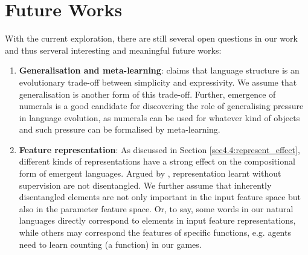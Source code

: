 \section{Future Works}
\label{sec5.2:future_work}

With the current exploration, there are still several open questions in our work and thus serveral interesting and meaningful future works:

\begin{enumerate}
    \item \textbf{Generalisation and meta-learning}: \cite{smith2013linguistic} claims that language structure is an evolutionary trade-off between simplicity and expressivity. We assume that generalisation is another form of this trade-off. Further, emergence of numerals is a good candidate for discovering the role of generalising pressure in language evolution, as numerals can be used for whatever kind of objects and such pressure can be formalised by meta-learning.
    \item \textbf{Feature representation}: As discussed in Section \ref{sec4.4:represent_effect}, different kinds of representations have a strong effect on the compositional form of emergent languages. Argued by \cite{locatello2018challenging}, representation learnt without supervision are not disentangled. We further assume that inherently disentangled elements are not only important in the input feature space but also in the parameter feature space. Or, to say, some words in our natural languages directly correspond to elements in input feature representations, while others may correspond the features of specific functions, e.g. agents need to learn counting (a function) in our games.
\end{enumerate}